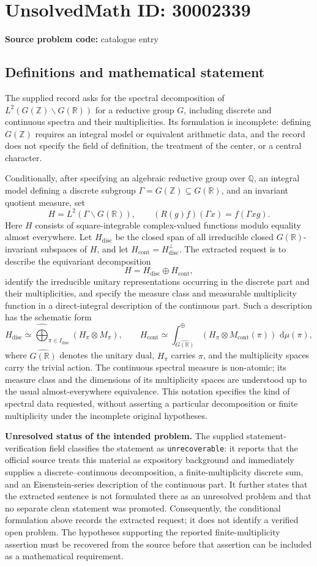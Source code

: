 \documentclass[11pt]{article}
\newcommand{\Z}{\mathbb{Z}}
\newcommand{\Q}{\mathbb{Q}}
\newcommand{\R}{\mathbb{R}}
\newcommand{\dd}{\,\mathrm{d}}
\begin{document}
\section*{UnsolvedMath ID: 30002339}
\textbf{Source problem code:} catalogue entry
\subsection{Definitions and mathematical statement}
The supplied record asks for the spectral decomposition of \(L^2(G(\Z)\backslash G(\R))\) for a reductive group \(G\), including discrete and continuous spectra and their multiplicities. Its formulation is incomplete: defining \(G(\Z)\) requires an integral model or equivalent arithmetic data, and the record does not specify the field of definition, the treatment of the center, or a central character.

Conditionally, after specifying an algebraic reductive group over \(\Q\), an integral model defining a discrete subgroup \(\Gamma=G(\Z)\subseteq G(\R)\), and an invariant quotient measure, set
\[
H=L^2(\Gamma\backslash G(\R)),\qquad (R(g)f)(\Gamma x)=f(\Gamma xg).
\]
Here \(H\) consists of square-integrable complex-valued functions modulo equality almost everywhere. Let \(H_{\mathrm{disc}}\) be the closed span of all irreducible closed \(G(\R)\)-invariant subspaces of \(H\), and let \(H_{\mathrm{cont}}=H_{\mathrm{disc}}^{\perp}\). The extracted request is to describe the equivariant decomposition
\[
H=H_{\mathrm{disc}}\oplus H_{\mathrm{cont}},
\]
identify the irreducible unitary representations occurring in the discrete part and their multiplicities, and specify the measure class and measurable multiplicity function in a direct-integral description of the continuous part. Such a description has the schematic form
\[
H_{\mathrm{disc}}\simeq\widehat{\bigoplus}_{\pi\in I_{\mathrm{disc}}}(H_\pi\otimes M_\pi),\qquad
H_{\mathrm{cont}}\simeq\int_{\widehat{G(\R)}}^{\oplus}(H_\pi\otimes M_{\mathrm{cont}}(\pi))\,\dd\mu(\pi),
\]
where \(\widehat{G(\R)}\) denotes the unitary dual, \(H_\pi\) carries \(\pi\), and the multiplicity spaces carry the trivial action. The continuous spectral measure is non-atomic; its measure class and the dimensions of its multiplicity spaces are understood up to the usual almost-everywhere equivalence. This notation specifies the kind of spectral data requested, without asserting a particular decomposition or finite multiplicity under the incomplete original hypotheses.

\textbf{Unresolved status of the intended problem.} The supplied statement-verification field classifies the statement as \texttt{unrecoverable}: it reports that the official source treats this material as expository background and immediately supplies a discrete--continuous decomposition, a finite-multiplicity discrete sum, and an Eisenstein-series description of the continuous part. It further states that the extracted sentence is not formulated there as an unresolved problem and that no separate clean statement was promoted. Consequently, the conditional formulation above records the extracted request; it does not identify a verified open problem. The hypotheses supporting the reported finite-multiplicity assertion must be recovered from the source before that assertion can be included as a mathematical requirement.
\end{document}
